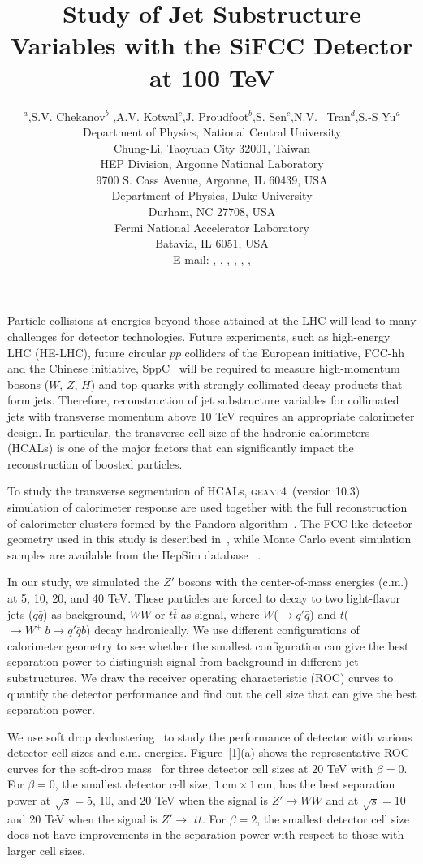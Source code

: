 \documentclass[a4paper]{PoS}
\title{Study of Jet Substructure Variables with the SiFCC Detector at 100 TeV}
\author{\speaker{C.-H Yeh}$^a$,S.V. Chekanov$^b$ ,A.V. Kotwal$^{c}$,J. Proudfoot$^{b}$,S. Sen$^{c}$,N.V. ~Tran$^{d}$,S.-S Yu$^{a}$\\     
     \llap{$^a$}Department of Physics, National Central University\\
     Chung-Li, Taoyuan City 32001, Taiwan\\
     \llap{$^b$}HEP Division, Argonne National Laboratory\\
     9700 S. Cass Avenue, Argonne, IL 60439, USA\\
     \llap{$^c$}Department of Physics, Duke University\\
     Durham, NC 27708, USA\\
     \llap{$^d$}Fermi National Accelerator Laboratory\\
     Batavia, IL 6051, USA\\
     E-mail:  \email{a9510130375@gmail.com},
     \email{chekanov@anl.gov},
     \email{kotwal@phy.duke.edu},
     \email{proudfoot@anl.gov},
     \email{sourav.sen@duke.edu},
     \email{ntran@fnal.gov},
     \email{syu@phy.ncu.edu.tw}}
\newcommand{\GEANTfour} {\textsc{geant4}}
\begin{document}
Particle collisions at energies  beyond those attained at the LHC will lead to many 
challenges for detector technologies.
Future experiments, such as high-energy LHC (HE-LHC),
future circular $pp$ colliders of the European initiative, FCC-hh~\cite{Benedikt:2206376} and the Chinese initiative, SppC~\cite{Tang:2015qga} will be required to measure high-momentum bosons ($W$, $Z$, $H$) and top quarks with strongly
collimated decay products that form jets.  
Therefore, reconstruction of jet substructure  variables for collimated jets with transverse 
momentum above 10 TeV
requires an appropriate calorimeter design.  In particular, the transverse cell size of the hadronic 
calorimeters  (HCALs) is one of the major factors that can significantly impact 
the reconstruction of boosted particles.

To study the transverse segmentuion of HCALs,
\GEANTfour\ (version 10.3) ~\cite{Allison:2016} simulation of calorimeter response are used together
with the full reconstruction of calorimeter clusters formed by the Pandora algorithm~\cite{Marshall:2013,Charles:2009ta}.
The FCC-like detector geometry used in this study is described in~\cite{Chekanov:2016ppq},
while Monte Carlo event simulation samples are available from the
HepSim database ~\cite{Chekanov:2014fga}.

In our study, we simulated the $Z'$ bosons with the center-of-mass energies (c.m.) at 5, 10, 20, and 40 TeV. These particles are forced to decay to two light-flavor jets ($q\bar{q}$) as background, $W W$ or $t\bar{t}$ as signal, where $W$($\rightarrow$$q'\bar{q}$) and $t$($ \rightarrow  W^+\>b \rightarrow q'\bar{q} b$) decay hadronically. We use different configurations of calorimeter geometry to see whether the smallest configuration can give the best separation power to distinguish signal from background in different jet substructures. We draw the receiver operating characteristic (ROC) curves to quantify the detector performance and find out the cell size that can give the best separation power.

We use soft drop declustering~\cite{Larkoski:2014wba} to study the performance of detector with various detector cell sizes and c.m. energies. Figure~\ref{1}(a) shows the representative ROC curves for the soft-drop mass~\cite{Larkoski:2014wba} for three detector cell sizes at 20 TeV with $\beta=0$. For $\beta=0$, the smallest detector cell size, $1~\mathrm{cm}\times1~\mathrm{cm}$, has the best separation power at $\sqrt{s}=$5, 10, and 20 TeV when the signal is $Z' \rightarrow WW$ and at $\sqrt{s}=$10 and 20 TeV when the signal is $Z' \rightarrow$ $t\bar{t}$. For $\beta=2$, the smallest detector cell size does not have improvements in the separation power with respect to those with larger cell sizes.
\end{document}
